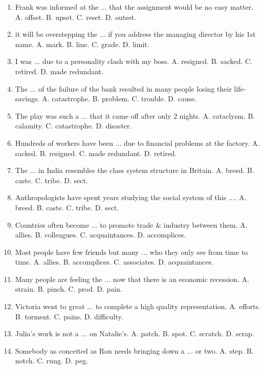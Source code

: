 \documentclass{article}
\numberwithin{equation}{section}
\begin{document}
\begin{enumerate}[leftmargin=2mm]
	\item Frank was informed at the $\ldots$ that the assignment would be no easy matter. {\sf A.} offset. {\sf B.} upset. {\sf C.} reset. {\sf D.} outset.
	\item it will be overstepping the $\ldots$ if you address the managing director by his 1st name. {\sf A.} mark. {\sf B.} line. {\sf C.} grade. {\sf D.} limit.
	\item I was $\ldots$ due to a personality clash with my boss. {\sf A.} resigned. {\sf B.} sacked. {\sf C.} retired. {\sf D.} made redundant.
	\item The $\ldots$ of the failure of the bank resulted in many people losing their life-savings. {\sf A.} catastrophe. {\sf B.} problem. {\sf C.} trouble. {\sf D.} cause.
	\item The play was such a $\ldots$ that it came off after only 2 nights. {\sf A.} cataclysm. {\sf B.} calamity. {\sf C.} catastrophe. {\sf D.} disaster.
	\item Hundreds of workers have been $\ldots$ due to financial problems at the factory. {\sf A.} sacked. {\sf B.} resigned. {\sf C.} made redundant. {\sf D.} retired.
	\item The $\ldots$ in India resembles the class system structure in Britain. {\sf A.} breed. {\sf B.} caste. {\sf C.} tribe. {\sf D.} sect.
	\item Anthropologists have spent years studying the social system of this $\ldots$. {\sf A.} breed. {\sf B.} caste. {\sf C.} tribe. {\sf D.} sect.
	\item Countries often become $\ldots$ to promote trade \& industry between them. {\sf A.} allies. {\sf B.} colleagues. {\sf C.} acquaintances. {\sf D.} accomplices.
	\item Most people have few friends but many $\ldots$ who they only see from time to time. {\sf A.} allies. {\sf B.} accomplices. {\sf C.} associates. {\sf D.} acquaintances.
	\item Many people are feeling the $\ldots$ now that there is an economic recession. {\sf A.} strain. {\sf B.} pinch. {\sf C.} prod. {\sf D.} pain.
	\item Victoria went to great $\ldots$ to complete a high quality representation. {\sf A.} efforts. {\sf B.} torment. {\sf C.} pains. {\sf D.} difficulty.
	\item Julia's work is not a $\ldots$ on Natalie's. {\sf A.} patch. {\sf B.} spot. {\sf C.} scratch. {\sf D.} scrap.
	\item Somebody as conceited as Ron needs bringing down a $\ldots$ or two. {\sf A.} step. {\sf B.} notch. {\sf C.} rung. {\sf D.} peg.

\end{enumerate}
\end{document}
